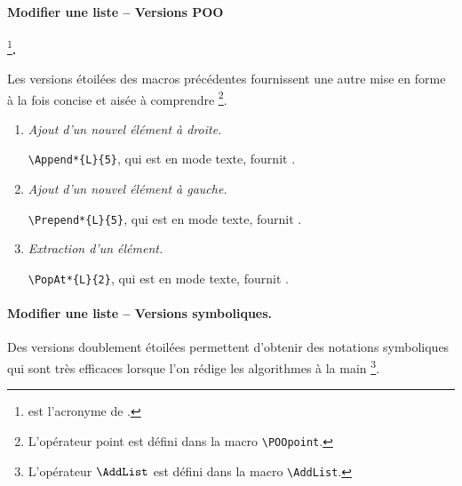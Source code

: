 \paragraph{Modifier une liste -- Versions POO}
\footnote{
	 est l'acronyme de .
}\textbf{.}\phantom{XX}\smallskip

Les versions étoilées des macros précédentes fournissent une autre mise en forme à la fois concise et aisée à comprendre
\footnote{
	L'opérateur point \POOpoint{} est défini dans la macro \texttt{\textbackslash{}POOpoint}.
}.

\begin{enumerate}
	\item \textit{Ajout d'un nouvel élément à droite.}

	      \verb++, qui est en mode texte, fournit \Append*{L}{5}.


	\item \textit{Ajout d'un nouvel élément à gauche.}

	      \verb++, qui est en mode texte, fournit \Prepend*{L}{5}.


	\item \textit{Extraction d'un élément.}

	      \verb++, qui est en mode texte, fournit \PopAt*{L}{2}.
\end{enumerate}



\paragraph{Modifier une liste -- Versions symboliques.}\phantom{XX}\smallskip

Des versions doublement étoilées permettent d'obtenir des notations symboliques qui sont très efficaces lorsque l'on rédige les algorithmes à la main
\footnote{
	L'opérateur $\AddList$ est défini dans la macro \texttt{\textbackslash{}AddList}.
}.

